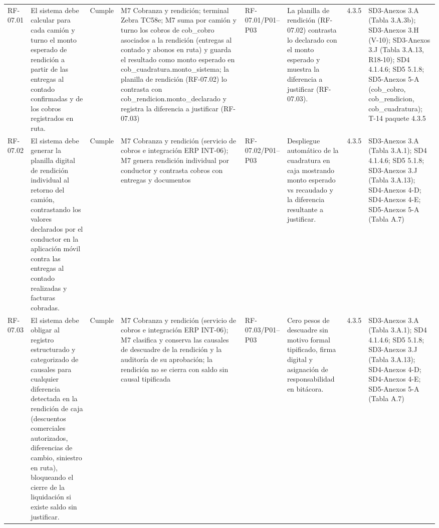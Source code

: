 \documentclass[oficio,firma,final]{lafrox}
\begin{document}
\begin{landscape}
{\begin{longtable}{@{}F{0.054} F{0.173} F{0.061} F{0.191} F{0.106} F{0.180} F{0.067} F{0.168}@{}}
  RF-07.01 & El sistema debe calcular para cada camión y turno el monto esperado de rendición a partir de las entregas al contado confirmadas y de los cobros registrados en ruta. & Cumple & M7 Cobranza y rendición; terminal Zebra TC58e; M7 suma por camión y turno los cobros de cob\_cobro asociados a la rendición (entregas al contado y abonos en ruta) y guarda el resultado como monto esperado en cob\_cuadratura.monto\_sistema; la planilla de rendición (RF-07.02) lo contrasta con cob\_rendicion.monto\_declarado y registra la diferencia a justificar (RF-07.03) & RF-07.01/\allowbreak{}P01--\allowbreak{}P03 & La planilla de rendición (RF-07.02) contrasta lo declarado con el monto esperado y muestra la diferencia a justificar (RF-07.03). & 4.3.5 & SD3-Anexos 3.A (Tabla 3.A.3b); SD3-Anexos 3.H (V-10); SD3-Anexos 3.J (Tabla 3.A.13, R18-10); SD4 4.1.4.6; SD5 5.1.8; SD5-Anexos 5-A (cob\_cobro, cob\_rendicion, cob\_cuadratura); T-14 paquete 4.3.5  \\
  RF-07.02 & El sistema debe generar la planilla digital de rendición individual al retorno del camión, contrastando los valores declarados por el conductor en la aplicación móvil contra las entregas al contado realizadas y facturas cobradas. & Cumple & M7 Cobranza y rendición (servicio de cobros e integración ERP INT-06); M7 genera rendición individual por conductor y contrasta cobros con entregas y documentos & RF-07.02/\allowbreak{}P01--\allowbreak{}P03 & Despliegue automático de la cuadratura en caja mostrando monto esperado vs recaudado y la diferencia resultante a justificar. & 4.3.5 & SD3-Anexos 3.A (Tabla 3.A.1); SD4 4.1.4.6; SD5 5.1.8; SD3-Anexos 3.J (Tabla 3.A.13); SD4-Anexos 4-D; SD4-Anexos 4-E; SD5-Anexos 5-A (Tabla A.7)  \\
  RF-07.03 & El sistema debe obligar al registro estructurado y categorizado de causales para cualquier diferencia detectada en la rendición de caja (descuentos comerciales autorizados, diferencias de cambio, siniestro en ruta), bloqueando el cierre de la liquidación si existe saldo sin justificar. & Cumple & M7 Cobranza y rendición (servicio de cobros e integración ERP INT-06); M7 clasifica y conserva las causales de descuadre de la rendición y la auditoría de su aprobación; la rendición no se cierra con saldo sin causal tipificada & RF-07.03/\allowbreak{}P01--\allowbreak{}P03 & Cero pesos de descuadre sin motivo formal tipificado, firma digital y asignación de responsabilidad en bitácora. & 4.3.5 & SD3-Anexos 3.A (Tabla 3.A.1); SD4 4.1.4.6; SD5 5.1.8; SD3-Anexos 3.J (Tabla 3.A.13); SD4-Anexos 4-D; SD4-Anexos 4-E; SD5-Anexos 5-A (Tabla A.7)  \\

\end{longtable}}
\end{landscape}
\end{document}
